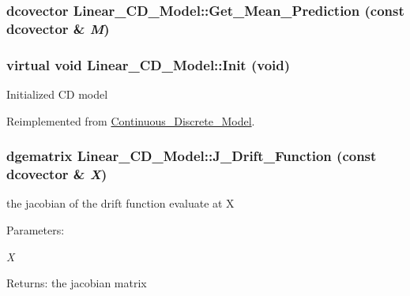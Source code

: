 \hypertarget{class_linear___c_d___model_1aa9a1ed9415253e316342e7b24c9966}{
\subsubsection[{Get\_\-Mean\_\-Prediction}]{\setlength{\rightskip}{0pt plus 5cm}dcovector Linear\_\-CD\_\-Model::Get\_\-Mean\_\-Prediction (const dcovector \& {\em M})}}
\label{class_linear___c_d___model_1aa9a1ed9415253e316342e7b24c9966}


\hypertarget{class_linear___c_d___model_c115137cf3ae0d1670880d5a8b0a8bd4}{
\subsubsection[{Init}]{\setlength{\rightskip}{0pt plus 5cm}virtual void Linear\_\-CD\_\-Model::Init (void)}}
\label{class_linear___c_d___model_c115137cf3ae0d1670880d5a8b0a8bd4}


Initialized CD model 

Reimplemented from \hyperlink{class_continuous___discrete___model_fb787d768352c5a38048c35e51e7735d}{Continuous\_\-Discrete\_\-Model}.\hypertarget{class_linear___c_d___model_6d063fdeaeba656c8449e1539f422e1a}{
\subsubsection[{J\_\-Drift\_\-Function}]{\setlength{\rightskip}{0pt plus 5cm}dgematrix Linear\_\-CD\_\-Model::J\_\-Drift\_\-Function (const dcovector \& {\em X})}}
\label{class_linear___c_d___model_6d063fdeaeba656c8449e1539f422e1a}


the jacobian of the drift function evaluate at X 

\begin{Desc}
\item[Parameters:]
\begin{description}
\item[{\em X}]\end{description}
\end{Desc}
\begin{Desc}
\item[Returns:]the jacobian matrix \end{Desc}



